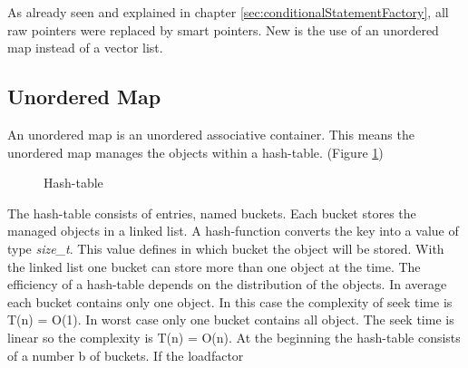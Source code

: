 {\newpage



\noindent As already seen and explained in chapter \ref{sec:conditionalStatementFactory}, all raw pointers were replaced by smart pointers. New is the use of an unordered map instead of a vector list. 

\subsection{Unordered Map}\label{sec:unorderedMap}
An unordered map is an unordered associative container. This means the unordered map manages the objects within a hash-table. (Figure \ref{fig:hashTable})

\begin{figure}[h]{}
\centering
\mbox{}
\caption{Hash-table \cite[][828]{Kirch2015}}
\label{fig:hashTable}
\end{figure}

\noindent The hash-table consists of entries, named buckets. Each bucket stores the managed objects in a linked list. A hash-function converts the key into a value of type \emph{size\_t}. This value defines in which bucket the object will be stored. With the linked list one bucket can store more than one object at the time. The efficiency of a hash-table depends on the distribution of the objects. In average each bucket contains only one object. In this case the complexity of seek time is T(n) = O(1). In worst case only one bucket contains all object. The seek time is linear so the complexity is T(n) = O(n). At the beginning the hash-table consists of a number b of buckets. If the loadfactor 

}
